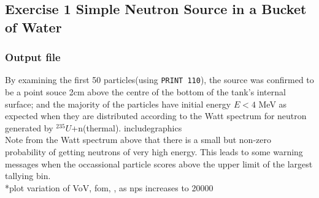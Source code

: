 \documentclass[a4paper, 12pt]{article}
\begin{document}
\subsection{Exercise 1 Simple Neutron Source in a Bucket of Water}
\subsubsection{Output file}
By examining the first 50 particles(using \texttt{PRINT 110}), the source was confirmed to be a point souce 2cm above the centre of the bottom of the tank's internal surface; and the majority of the particles have initial energy $E<4$ MeV as expected when they are distributed according to the Watt spectrum for neutron generated by ${}^{235}U$+n(thermal).
includegraphics
\\Note from the Watt spectrum above that there is a small but non-zero probability of getting neutrons of very high energy. This leads to some warning messages when the occassional particle scores above the upper limit of the largest tallying bin.
\\*plot variation of VoV, fom, , as nps increases to 20000\\
\end{document}
